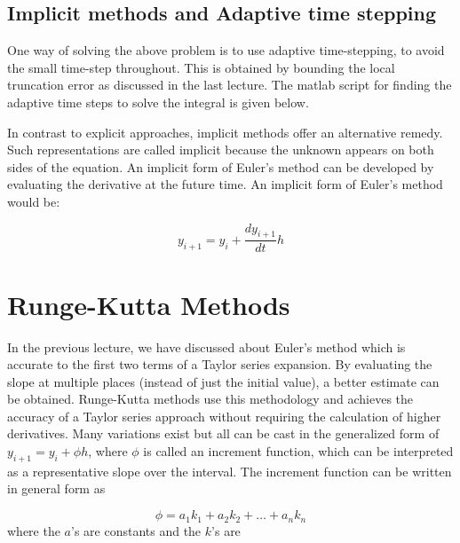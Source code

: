 \documentclass[book.tex]{subfiles}
\begin{document}
\subsection{Implicit methods and Adaptive time stepping}

One way of solving the above problem is to use adaptive time-stepping, to avoid the small time-step throughout. This is obtained by bounding the local truncation error as discussed in the last lecture. The matlab script for finding the adaptive time steps to solve the integral is given below.


In contrast to explicit approaches, implicit methods offer an alternative remedy.
Such representations are called implicit because the unknown appears on both sides of the equation. An implicit form of Euler’s method can be developed by evaluating the derivative at the future time. An implicit form of Euler's method would be:

\begin{equation*}
y_{i+1} = y_i + \dfrac{dy_{i+1}}{dt}h
\end{equation*}

\section{Runge-Kutta Methods}

In the previous lecture, we have discussed about Euler's method which is accurate to the first two terms of a Taylor series expansion. By evaluating the slope at multiple places (instead of just the initial value), a better estimate can be obtained. Runge-Kutta methods use this methodology and achieves the accuracy of a Taylor series approach without requiring the calculation of higher derivatives. Many variations exist but all can be cast in the generalized form of $y_{i+1} = y_{i} + \phi h$, where $\phi$ is called an increment function, which can be interpreted as a representative slope over the interval. The increment function can be written in general form as

\begin{equation*}
\phi = a_{1}k_{1} + a_2k_2 + \dots + a_nk_n
\end{equation*}
where the $a$’s are constants and the $k$’s are
\end{document}

